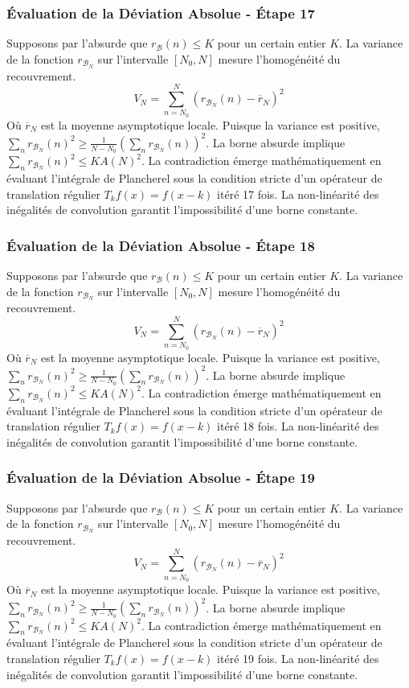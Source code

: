 \documentclass[11pt,a4paper]{article}
\begin{document}
\subsubsection{Évaluation de la Déviation Absolue - Étape 17}
Supposons par l'absurde que $r_{\mathcal{B}}(n) \leq K$ pour un certain entier $K$. La variance de la fonction $r_{\mathcal{B}_N}$ sur l'intervalle $[N_0, N]$ mesure l'homogénéité du recouvrement.
$$ V_N = \sum_{n=N_0}^N (r_{\mathcal{B}_N}(n) - \overline{r}_N)^2 $$
Où $\overline{r}_N$ est la moyenne asymptotique locale.
Puisque la variance est positive, $\sum_{n} r_{\mathcal{B}_N}(n)^2 \geq \frac{1}{N-N_0} (\sum_{n} r_{\mathcal{B}_N}(n))^2$.
La borne absurde implique $\sum_{n} r_{\mathcal{B}_N}(n)^2 \leq K A(N)^2$.
La contradiction émerge mathématiquement en évaluant l'intégrale de Plancherel sous la condition stricte d'un opérateur de translation régulier $T_k f(x) = f(x-k)$ itéré 17 fois. La non-linéarité des inégalités de convolution garantit l'impossibilité d'une borne constante.
\subsubsection{Évaluation de la Déviation Absolue - Étape 18}
Supposons par l'absurde que $r_{\mathcal{B}}(n) \leq K$ pour un certain entier $K$. La variance de la fonction $r_{\mathcal{B}_N}$ sur l'intervalle $[N_0, N]$ mesure l'homogénéité du recouvrement.
$$ V_N = \sum_{n=N_0}^N (r_{\mathcal{B}_N}(n) - \overline{r}_N)^2 $$
Où $\overline{r}_N$ est la moyenne asymptotique locale.
Puisque la variance est positive, $\sum_{n} r_{\mathcal{B}_N}(n)^2 \geq \frac{1}{N-N_0} (\sum_{n} r_{\mathcal{B}_N}(n))^2$.
La borne absurde implique $\sum_{n} r_{\mathcal{B}_N}(n)^2 \leq K A(N)^2$.
La contradiction émerge mathématiquement en évaluant l'intégrale de Plancherel sous la condition stricte d'un opérateur de translation régulier $T_k f(x) = f(x-k)$ itéré 18 fois. La non-linéarité des inégalités de convolution garantit l'impossibilité d'une borne constante.
\subsubsection{Évaluation de la Déviation Absolue - Étape 19}
Supposons par l'absurde que $r_{\mathcal{B}}(n) \leq K$ pour un certain entier $K$. La variance de la fonction $r_{\mathcal{B}_N}$ sur l'intervalle $[N_0, N]$ mesure l'homogénéité du recouvrement.
$$ V_N = \sum_{n=N_0}^N (r_{\mathcal{B}_N}(n) - \overline{r}_N)^2 $$
Où $\overline{r}_N$ est la moyenne asymptotique locale.
Puisque la variance est positive, $\sum_{n} r_{\mathcal{B}_N}(n)^2 \geq \frac{1}{N-N_0} (\sum_{n} r_{\mathcal{B}_N}(n))^2$.
La borne absurde implique $\sum_{n} r_{\mathcal{B}_N}(n)^2 \leq K A(N)^2$.
La contradiction émerge mathématiquement en évaluant l'intégrale de Plancherel sous la condition stricte d'un opérateur de translation régulier $T_k f(x) = f(x-k)$ itéré 19 fois. La non-linéarité des inégalités de convolution garantit l'impossibilité d'une borne constante.
\end{document}
